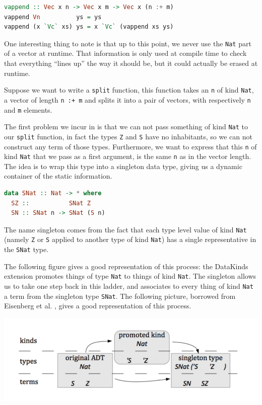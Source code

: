 \documentclass[11pt]{article}
\begin{document}
\begin{lstlisting}[language=haskell]
vappend :: Vec x n -> Vec x m -> Vec x (n :+ m)
vappend Vn          ys = ys
vappend (x `Vc` xs) ys = x `Vc` (vappend xs ys)
\end{lstlisting}

One interesting thing to note is that up to this point, we never use the
\texttt{Nat} part of a vector at runtime. That information is only used
at compile time to check that everything ``lines up'' the way it should
be, but it could actually be erased at runtime.

Suppose we want to write a \texttt{split} function, this function takes
an \texttt{n} of kind \texttt{Nat}, a vector of length \texttt{n\ :+\ m}
and splits it into a pair of vectors, with respectively \texttt{n} and
\texttt{m} elements.

The first problem we incur in is that we can not pass something of kind
\texttt{Nat} to our \texttt{split} function, in fact the types \texttt{Z} and \texttt{S} have no inhabitants, so we can
not construct any term of those types. Furthermore, we want to
express that this \texttt{n} of kind \texttt{Nat} that we pass as a
first argument, is the same \texttt{n} as in the vector length. The idea is to 
wrap this type into a singleton data type, giving us a dynamic container of the static 
information.

\begin{lstlisting}[language=haskell]
data SNat :: Nat -> * where
  SZ ::           SNat Z
  SN :: SNat n -> SNat (S n)
\end{lstlisting}

The name singleton comes from the fact that each type level value of
kind \texttt{Nat} (namely \texttt{Z} or \texttt{S} applied to another
type of kind \texttt{Nat}) has a single representative in the
\texttt{SNat} type.

The following figure gives a good representation of this process: the
DataKinds extension promotes things of type \texttt{Nat} to things of
kind \texttt{Nat}. The singleton allows us to take one step back in this
ladder, and associates to every thing of kind \texttt{Nat} a term from
the singleton type \texttt{SNat}. The following picture, borrowed from Eisenberg et al. \cite{singletons}, gives a good 
representation of this process.

\includegraphics[width=\textwidth]{singleton.png}
\end{document}
